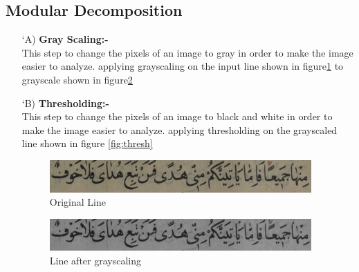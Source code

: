 \subsection{Modular Decomposition}

\begin{itemize}[labelindent=1em,labelsep=0.25cm,leftmargin=*]

     \item[\char `A)] \textbf{Gray Scaling:- } \\ 
        This step to change the pixels of an image to gray in order to  make the image easier to analyze.
        applying grayscaling on the input line shown
        in figure\ref{fig:origin}  to grayscale shown in figure\ref{fig:gray}
        
        \item[\char `B)] \textbf{Thresholding:- } \\ 
        This step to change the pixels of an image to black and white in order to  make the image easier to analyze.
        applying thresholding on the grayscaled line shown in figure \ref{fig:thresh}
        
         \begin{figure}[H]
        \centering
        \includegraphics[width=10cm]{images/origin.png}
        \caption{Original Line}
        \label{fig:origin}
        \end{figure}
        
         \begin{figure}[H]
        \centering
        \includegraphics[width=10cm]{images/gray.png}
        \caption{Line after grayscaling}
        \label{fig:gray}
        \end{figure}
        

\end{itemize}
